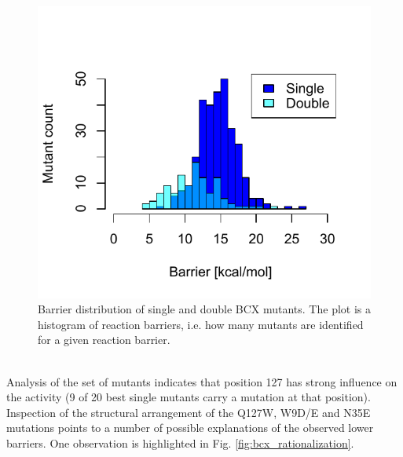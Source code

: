 \begin{figure}[htbp] 
\centering
\includegraphics[width=0.95\linewidth]{barrier-distribution.pdf}
\caption{
Barrier distribution of single and double BCX mutants\cite{hediger2013computational}.
The plot is a histogram of reaction barriers, i.e. how many mutants are identified for a given reaction barrier.
}
\label{fig:bcx_barrier_distribution}
\end{figure}
\\
Analysis of the set of mutants indicates that position 127 has strong influence on the activity (9 of 20 best single mutants carry a mutation at that position).
Inspection of the structural arrangement of the Q127W, W9D/E and N35E mutations points to a number of possible explanations of the observed lower barriers.
One observation is highlighted in Fig. \ref{fig:bcx_rationalization}.
